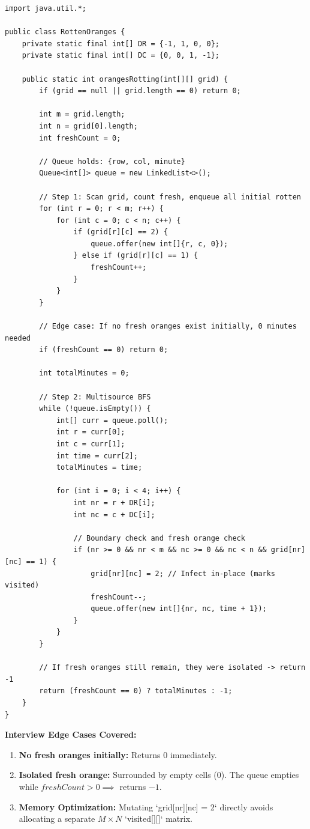 \documentclass[10pt,journal,compsoc,onecolumn]{IEEEtran}
\begin{document}
\begin{verbatim}
import java.util.*;

public class RottenOranges {
    private static final int[] DR = {-1, 1, 0, 0};
    private static final int[] DC = {0, 0, 1, -1};

    public static int orangesRotting(int[][] grid) {
        if (grid == null || grid.length == 0) return 0;

        int m = grid.length;
        int n = grid[0].length;
        int freshCount = 0;

        // Queue holds: {row, col, minute}
        Queue<int[]> queue = new LinkedList<>();

        // Step 1: Scan grid, count fresh, enqueue all initial rotten
        for (int r = 0; r < m; r++) {
            for (int c = 0; c < n; c++) {
                if (grid[r][c] == 2) {
                    queue.offer(new int[]{r, c, 0});
                } else if (grid[r][c] == 1) {
                    freshCount++;
                }
            }
        }

        // Edge case: If no fresh oranges exist initially, 0 minutes needed
        if (freshCount == 0) return 0;

        int totalMinutes = 0;

        // Step 2: Multisource BFS
        while (!queue.isEmpty()) {
            int[] curr = queue.poll();
            int r = curr[0];
            int c = curr[1];
            int time = curr[2];
            totalMinutes = time;

            for (int i = 0; i < 4; i++) {
                int nr = r + DR[i];
                int nc = c + DC[i];

                // Boundary check and fresh orange check
                if (nr >= 0 && nr < m && nc >= 0 && nc < n && grid[nr][nc] == 1) {
                    grid[nr][nc] = 2; // Infect in-place (marks visited)
                    freshCount--;
                    queue.offer(new int[]{nr, nc, time + 1});
                }
            }
        }

        // If fresh oranges still remain, they were isolated -> return -1
        return (freshCount == 0) ? totalMinutes : -1;
    }
}
\end{verbatim}

\textbf{Interview Edge Cases Covered:}
\begin{enumerate}
    \item \textbf{No fresh oranges initially:} Returns $0$ immediately.
    \item \textbf{Isolated fresh orange:} Surrounded by empty cells ($0$). The queue empties while $freshCount > 0 \implies$ returns $-1$.
    \item \textbf{Memory Optimization:} Mutating `grid[nr][nc] = 2` directly avoids allocating a separate $M \times N$ `visited[][]` matrix.
\end{enumerate}
\end{document}
